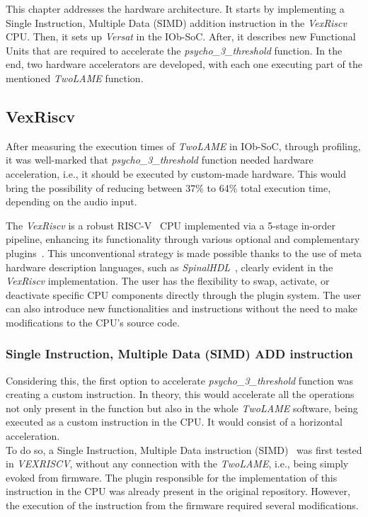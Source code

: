 
This chapter addresses the hardware architecture. It starts by implementing a Single Instruction, Multiple Data (SIMD) addition instruction in the \textit{VexRiscv} CPU. Then, it sets up \textit{Versat} in the IOb-SoC. After, it describes new Functional Units that are required to accelerate the \textit{psycho\_3\_threshold} function. In the end, two hardware accelerators are developed, with each one executing part of the mentioned \textit{TwoLAME} function.

\subsection{VexRiscv}
After measuring the execution times of \textit{TwoLAME} in IOb-SoC, through profiling, it was well-marked that \textit{psycho\_3\_threshold} function needed hardware acceleration, i.e., it should be executed by custom-made hardware. This would bring the possibility of reducing between 37\% to 64\% total execution time, depending on the audio input.

The \textit{VexRiscv} is a robust RISC-V~\cite{bib:riscvmanual} CPU implemented via a 5-stage in-order pipeline, enhancing its functionality through various optional and complementary plugins~\cite{bib:iobvexriscv}. This unconventional strategy is made possible thanks to the use of meta hardware description languages, such as \textit{SpinalHDL}~\cite{bib:spinalhdl}, clearly evident in the \textit{VexRiscv} implementation. The user has the flexibility to swap, activate, or deactivate specific CPU components directly through the plugin system. The user can also introduce new functionalities and instructions without the need to make modifications to the CPU's source code.


\subsubsection{Single Instruction, Multiple Data (SIMD) ADD instruction}
Considering this, the first option to accelerate \textit{psycho\_3\_threshold} function was creating a custom instruction. In theory, this would accelerate all the operations not only present in the function but also in the whole \textit{TwoLAME} software, being executed as a custom instruction in the CPU. It would consist of a horizontal acceleration.\\
To do so, a Single Instruction, Multiple Data instruction (SIMD)~\cite{simd} was first tested in \textit{VEXRISCV}, without any connection with the \textit{TwoLAME}, i.e., being simply evoked from firmware. The plugin responsible for the implementation of this instruction in the CPU was already present in the original repository. However, the execution of the instruction from the firmware required several modifications.

